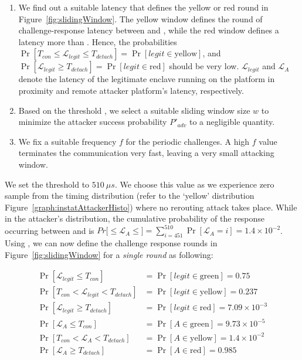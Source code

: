 \begin{enumerate}
  \item We find out a suitable latency \detach that defines the yellow or red round in Figure~\ref{fig:slidingWindow}. The yellow window defines the round of challenge-response latency between \connect and \detach, while the red window defines a latency more than \detach. Hence, the probabilities $\Pr[T_{con}\leq \mathcal{L}_{legit}\leq T_{detach}]=\Pr[legit\in\text{yellow}]$, and $\Pr[\mathcal{L}_{legit} \geq T_{detach}]=\Pr[legit\in\text{red}]$ should be very low. $\mathcal{L}_{legit}$ and $\mathcal{L}_{A}$ denote the latency of the legitimate enclave running on the platform in proximity and remote attacker platform's latency, respectively.
  \item Based on the threshold \detach, we select a suitable sliding window size $w$ to minimize the attacker success probability $P'_{adv}$ to a negligible quantity.
  \item We fix a suitable frequency $f$ for the periodic challenges. A high $f$ value terminates the communication very fast, leaving a very small attacking window.
\end{enumerate}

 We set the threshold \detach to $510\ \mu s$. We choose this value as we experience zero sample from the timing distribution (refer to the `yellow' distribution Figure~\ref{graph:instatAttackerHisto}) where no rerouting attack takes place. While in the attacker's distribution, the cumulative probability of the response occurring between \connect and \detach is $Pr[$\connect$\leq \mathcal{L}_{A} \leq$\detach$]=\sum_{i=451}^{510}\Pr[\mathcal{L}_{A}=i]=1.4\times10^{-2}$. 
Using \detach, we can now define the challenge response rounds in Figure~\ref{fig:slidingWindow} for a \emph{single round} as following:

\begin{align*}
\Pr[\mathcal{L}_{legit}\leq T_{con}]&=\Pr[legit\in\text{green}]=0.75\\
\Pr[T_{con}< \mathcal{L}_{legit}< T_{detach}]&=\Pr[legit\in\text{yellow}]= 0.237\\
\Pr[\mathcal{L}_{legit}\geq T_{detach}]&=\Pr[legit\in\text{red}]= 7.09\times10^{-3}\\
\Pr[\mathcal{L}_{A}\leq T_{con}]&=\Pr[A\in\text{green}]=9.73\times10^{-5}\\
\Pr[T_{con}< \mathcal{L}_{A}< T_{detach}]&=\Pr[A\in\text{yellow}]= 1.4\times10^{-2}\\
\Pr[\mathcal{L}_{A}\geq T_{detach}]&=\Pr[A\in\text{red}]= 0.985\\
\end{align*} 



